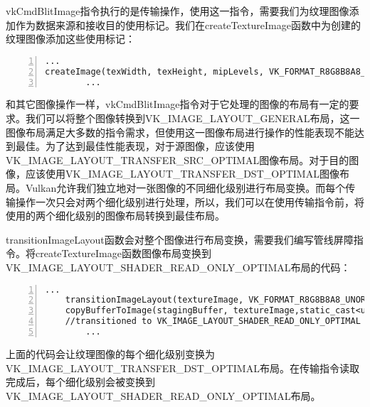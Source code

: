 \documentclass{ctexart}
\begin{document}
vkCmdBlitImage指令执行的是传输操作，使用这一指令，需要我们为纹理图像添加作为数据来源和接收目的使用标记。我们在createTextureImage函数中为创建的纹理图像添加这些使用标记：

\begin{lstlisting}[language={[ANSI]C},keywordstyle=\color{blue!70},commentstyle=\color{red!50!green!50!blue!50},frame=shadowbox, rulesepcolor=\color{red!20!green!20!blue!20},basicstyle=\small,numbers=left, numberstyle=\tiny,breaklines=true]
		...
createImage(texWidth, texHeight, mipLevels, VK_FORMAT_R8G8B8A8_UNORM, VK_IMAGE_TILING_OPTIMAL, VK_IMAGE_USAGE_TRANSFER_SRC_BIT | VK_IMAGE_USAGE_TRANSFER_DST_BIT | VK_IMAGE_USAGE_SAMPLED_BIT, VK_MEMORY_PROPERTY_DEVICE_LOCAL_BIT, textureImage, textureImageMemory);
		...
\end{lstlisting}

和其它图像操作一样，vkCmdBlitImage指令对于它处理的图像的布局有一定的要求。我们可以将整个图像转换到VK\_IMAGE\_LAYOUT\_GENERAL布局，这一图像布局满足大多数的指令需求，但使用这一图像布局进行操作的性能表现不能达到最佳。为了达到最佳性能表现，对于源图像，应该使用VK\_IMAGE\_LAYOUT\_TRANSFER\_SRC\_OPTIMAL图像布局。对于目的图像，应该使用VK\_IMAGE\_LAYOUT\_TRANSFER\_DST\_OPTIMAL图像布局。Vulkan允许我们独立地对一张图像的不同细化级别进行布局变换。而每个传输操作一次只会对两个细化级别进行处理，所以，我们可以在使用传输指令前，将使用的两个细化级别的图像布局转换到最佳布局。

transitionImageLayout函数会对整个图像进行布局变换，需要我们编写管线屏障指令。将createTextureImage函数图像布局变换到VK\_IMAGE\_LAYOUT\_SHADER\_READ\_ONLY\_OPTIMAL布局的代码：

\begin{lstlisting}[language={[ANSI]C},keywordstyle=\color{blue!70},commentstyle=\color{red!50!green!50!blue!50},frame=shadowbox, rulesepcolor=\color{red!20!green!20!blue!20},basicstyle=\small,numbers=left, numberstyle=\tiny,breaklines=true]
		...
	transitionImageLayout(textureImage, VK_FORMAT_R8G8B8A8_UNORM, VK_IMAGE_LAYOUT_UNDEFINED, VK_IMAGE_LAYOUT_TRANSFER_DST_OPTIMAL, mipLevels);
	copyBufferToImage(stagingBuffer, textureImage,static_cast<uint32_t>(texWidth), static_cast<uint32_t>(texHeight));
	//transitioned to VK_IMAGE_LAYOUT_SHADER_READ_ONLY_OPTIMAL while generating mipmaps
		...
\end{lstlisting}

上面的代码会让纹理图像的每个细化级别变换为VK\_IMAGE\_LAYOUT\_TRANSFER\_DST\_OPTIMAL布局。在传输指令读取完成后，每个细化级别会被变换到VK\_IMAGE\_LAYOUT\_SHADER\_READ\_ONLY\_OPTIMAL布局。
\end{document}
